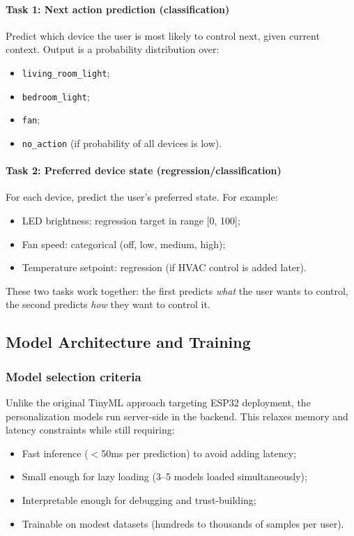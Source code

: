 \paragraph{Task 1: Next action prediction (classification)}
Predict which device the user is most likely to control next, given
current context. Output is a probability distribution over:
\begin{itemize}
    \item \texttt{living\_room\_light};
    \item \texttt{bedroom\_light};
    \item \texttt{fan};
    \item \texttt{no\_action} (if probability of all devices is low).
\end{itemize}

\paragraph{Task 2: Preferred device state (regression/classification)}
For each device, predict the user's preferred state. For example:
\begin{itemize}
    \item LED brightness: regression target in range [0, 100];
    \item Fan speed: categorical (off, low, medium, high);
    \item Temperature setpoint: regression (if HVAC control is added later).
\end{itemize}

These two tasks work together: the first predicts \emph{what} the user
wants to control, the second predicts \emph{how} they want to control it.

\subsection{Model Architecture and Training}
\label{sec:model-training}

\subsubsection{Model selection criteria}

Unlike the original TinyML approach targeting ESP32 deployment, the
personalization models run server-side in the backend. This relaxes
memory and latency constraints while still requiring:
\begin{itemize}
    \item Fast inference ($<$50ms per prediction) to avoid adding latency;
    \item Small enough for lazy loading (3--5 models loaded simultaneously);
    \item Interpretable enough for debugging and trust-building;
    \item Trainable on modest datasets (hundreds to thousands of samples per user).
\end{itemize}

